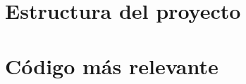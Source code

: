 


\chapter{Estructura del proyecto\label{apen:estructura proyecto}}

\chapter{Código más relevante\label{apen:codigo}}


